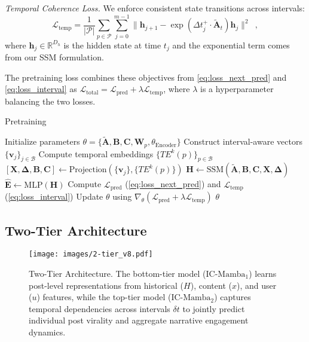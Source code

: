\emph{Temporal Coherence Loss.} 
We enforce consistent state transitions across intervals:
\begin{equation}
  \label{eq:loss_interval}
        \mathcal{L}_\text{temp} = \frac{1}{|\mathcal{P}|} \sum_{p \in \mathcal{P}} \sum_{j=0}^{m-1} \|\mathbf{h}_{j+1} - \exp(\Delta t_j^+ \cdot \tilde{\mathbf{A}}_t)\mathbf{h}_j\|^2 \enspace,
\end{equation}
where $\mathbf{h}_j \in \mathbb{R}^{D_h}$ is the hidden state at time $t_j$ and the exponential term comes from our SSM formulation.%

The pretraining loss combines these objectives from \cref{eq:loss_next_pred} and \cref{eq:loss_interval} as $\mathcal{L}_\text{total} = \mathcal{L}_\text{pred} + \lambda \mathcal{L}_\text{temp}$,
where $\lambda$ is a hyperparameter balancing the two losses.
% 


\begin{algorithm}[t]
\caption{\icmamba Pretraining}
\label{alg:pretraining}
\begin{algorithmic}[1]
\State Initialize parameters $\theta = \{\tilde{\mathbf{A}}, \mathbf{B}, \mathbf{C}, \mathbf{W}_p, \theta_\text{Encoder}\}$
        \State Construct interval-aware vectors $\{\mathbf{v}_{j}\}_{j \in \mathcal{B}}$ 
        \State Compute temporal embeddings $\{TE^k(p)\}_{p \in \mathcal{B}}$
        \State $[\mathbf{X}, \boldsymbol{\Delta}, \mathbf{B}, \mathbf{C}] \gets \text{Projection}(\{\mathbf{v}_{j}\}, \{TE^k(p)\})$
        \State $\mathbf{H} \gets \text{SSM}(\tilde{\mathbf{A}}, \mathbf{B}, \mathbf{C}, \mathbf{X}, \boldsymbol{\Delta})$
        \State $\hat{\mathbf{E}} \gets \text{MLP}(\mathbf{H})$
        \State Compute $\mathcal{L}_\text{pred}$ (\cref{eq:loss_next_pred}) and $\mathcal{L}_\text{temp}$ (\cref{eq:loss_interval})
        \State Update $\theta$ using $\nabla_\theta(\mathcal{L}_\text{pred} + \lambda \mathcal{L}_\text{temp})$
    \EndFor
\EndFor
\State \Return $\theta$
\end{algorithmic}
\end{algorithm}

  
\subsection{Two-Tier \icmamba Architecture}
\label{subsec:two-tier-arch}

\begin{figure}[t]
  \centering
  \texttt{[image: images/2-tier\_v8.pdf]}
  \caption{
    Two-Tier \icmamba Architecture. The bottom-tier model ($\text{IC-Mamba}_{1}$) learns post-level representations from historical ($H$), content ($x$), and user ($u$) features, while the top-tier model ($\text{IC-Mamba}_2$) captures temporal dependencies across intervals $\delta t$ to jointly predict individual post virality and aggregate narrative engagement dynamics.
  }
  \label{fig:2tier_ic-mamba}
\end{figure}


